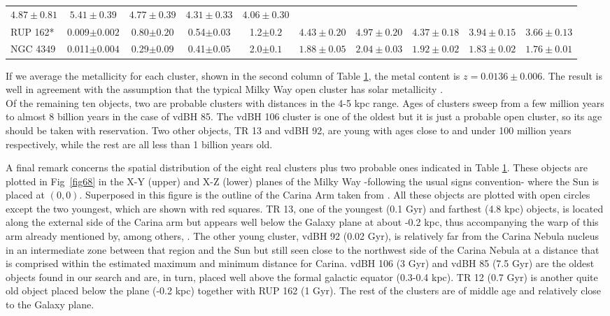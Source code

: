 \documentclass[draft]{aa}
\begin{document}
\begin{table}[ht]
\begin{tabular}{lccccccccc}
 $4.87\pm0.81$ & $5.41\pm0.39$ & $4.77\pm0.39$ & $4.31\pm0.33$ & $4.06\pm0.30$\\
 RUP 162* & 0.009$\pm0.002$ & 0.80$\pm0.20$ & 0.54$\pm0.03$ & 1.2$\pm0.2$ &
 $4.43\pm0.20$ & $4.97\pm0.20$ & $4.37\pm0.18$ & $3.94\pm0.15$ & $3.66\pm0.13$\\
 NGC 4349 & 0.011$\pm0.004$ & 0.29$\pm0.09$ & 0.41$\pm0.05$ & 2.0$\pm0.1$ &
 $1.88\pm0.05$ & $2.04\pm0.03$ & $1.92\pm0.02$ & $1.83\pm0.02$ & $1.76\pm0.01$\\
\hline
\end{tabular}
\label{tab:final_tab}
\end{table}

If we average the metallicity for each cluster, shown in the second
column of Table \ref{tab:final_tab}, the metal content is $z=0.0136\pm0.006$.
The result is well in agreement with the assumption that the typical Milky Way
open cluster has solar metallicity \citep[$z=0.0152$,][]{Bressan_2012}.\\

Of the remaining ten objects, two are probable clusters with distances in the
4-5 kpc range. Ages of clusters sweep from a few million years
to almost 8 billion years in the case of vdBH 85. The vdBH 106 cluster
is one of the oldest but it is just a probable open cluster, so its age should
be taken with reservation. Two other objects, TR 13 and vdBH 92, are young with
ages close to and under 100 million years respectively, while the rest are all
less than 1 billion years old.

A final remark concerns the spatial distribution of the
eight real clusters plus two probable ones indicated in Table 
\ref{tab:final_tab}. These objects  are plotted in Fig~\ref{fig68} in the X-Y
(upper) and X-Z (lower) planes of the Milky Way -following the usual signs
convention- where the Sun is placed at $(0, 0)$. Superposed in this
figure is the outline of the Carina Arm taken from \cite{valle_2005}. All
these objects are plotted with open circles except the two youngest,
which are shown with red squares. TR 13, one of the youngest (0.1 Gyr)
and farthest (4.8 kpc) objects, is located along the external side of the
Carina arm but appears well below the Galaxy plane at about -0.2 kpc, thus
accompanying the warp of this arm already mentioned by, among others,
\cite{Cersosimo_2009}. 
The other young cluster, vdBH 92 (0.02 Gyr), is relatively far from the Carina
Nebula nucleus in an intermediate zone between that region and the Sun but
still seen close to the northwest side of the Carina Nebula at a distance
that is comprised within the estimated maximum and minimum distance for Carina.
vdBH 106 (3 Gyr) and vdBH 85 (7.5 Gyr) are the oldest objects found in our
search and are, in turn, placed well above the formal galactic equator (0.3-0.4
kpc). TR 12 (0.7 Gyr) is another quite old object placed below the plane (-0.2
kpc) together with RUP 162 (1 Gyr). The rest of the clusters are of middle age
and relatively close to the Galaxy plane.
\end{document}
